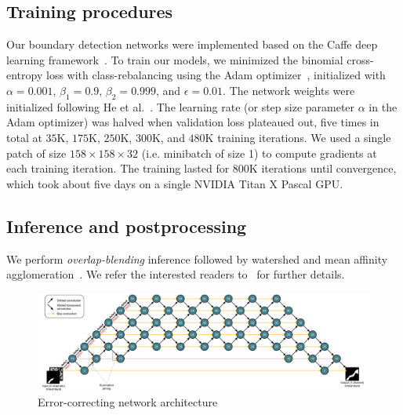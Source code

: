 \documentclass{article}
\begin{document}
\begin{appendices}
\subsection{Training procedures}
Our boundary detection networks were implemented based on the Caffe deep
learning framework~\cite{jia2014caffe}. To train our models, we minimized the
binomial cross-entropy loss with class-rebalancing using the Adam
optimizer~\cite{adam}, initialized with $\alpha=0.001$, $\beta_1=0.9$,
$\beta_2=0.999$, and $\epsilon=0.01$. The network weights were initialized
following He et al.~\cite{he2015delving}. The learning rate (or step size
parameter $\alpha$ in the Adam optimizer) was halved when validation loss
plateaued out, five times in total at $35$K, $175$K, $250$K, $300$K, and
$480$K training iterations. We used a single patch of size
$158\times158\times32$ (i.e. minibatch of size 1) to compute gradients at each
training iteration. The training lasted for $800$K iterations until convergence,
which took about five days on a single NVIDIA Titan X Pascal GPU.

\subsection{Inference and postprocessing}
We perform \emph{overlap-blending} inference followed by watershed and mean affinity agglomeration~\cite{kisuk}. We refer the interested readers to~\cite{kisuk} for further details.

\label{appendix:architecture}
\begin{figure}
\centering
\includegraphics[width=1.0\linewidth]{corrector.pdf}
\caption{Error-correcting network architecture}
\end{figure}


\end{appendices}
\end{document}
